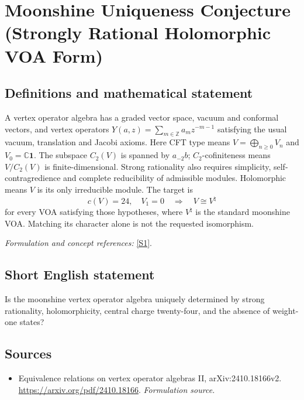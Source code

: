 \documentclass[11pt]{article}
\begin{document}
\section*{\texorpdfstring{Moonshine Uniqueness Conjecture (Strongly Rational Holomorphic VOA Form)}{Moonshine Uniqueness Conjecture (Strongly Rational Holomorphic VOA Form)}}\label{30006817}
\subsection{Definitions and mathematical statement}
A vertex operator algebra has a graded vector space, vacuum and conformal vectors, and vertex operators $Y(a,z)=\sum_{m\in{\mathbb{Z}}}a_mz^{-m-1}$ satisfying the usual vacuum, translation and Jacobi axioms. Here CFT type means $V=\bigoplus_{n\ge0}V_n$ and $V_0={\mathbb{C}}\mathbf1$. The subspace $C_2(V)$ is spanned by $a_{-2}b$; $C_2$-cofiniteness means $V/C_2(V)$ is finite-dimensional. Strong rationality also requires simplicity, self-contragredience and complete reducibility of admissible modules. Holomorphic means $V$ is its only irreducible module. The target is
\[
 c(V)=24,\quad V_1=0\quad\Longrightarrow\quad V\cong V^{\natural}
\]
for every VOA satisfying those hypotheses, where $V^{\natural}$ is the standard moonshine VOA. Matching its character alone is not the requested isomorphism.
\par\smallskip\textit{Formulation and concept references:} \href{https://arxiv.org/pdf/2410.18166}{[S1]}.

\subsection{Short English statement}
Is the moonshine vertex operator algebra uniquely determined by strong rationality, holomorphicity, central charge twenty-four, and the absence of weight-one states?
\subsection{Sources}
\begin{itemize}
\item[S1]Equivalence relations on vertex operator algebras II, arXiv:2410.18166v2.
\url{https://arxiv.org/pdf/2410.18166}.
\textit{Formulation source.}
\end{itemize}
\end{document}
